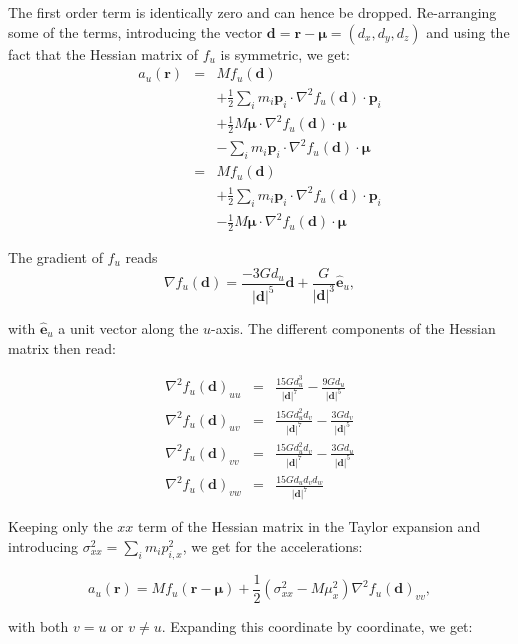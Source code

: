 \documentclass[a4paper,10pt]{article}
\newcommand{\rr}{\mathbf{r}}
\newcommand{\dd}{\mathbf{d}}
\newcommand{\p}[1]{\mathbf{p}_#1}
\newcommand{\muu}{\boldsymbol{\mu}}
\begin{document}
The first order term is identically zero and can hence be dropped. Re-arranging some of the terms, introducing the 
vector $\dd=\rr-\muu=(d_x,d_y,d_z)$ and using the fact that the Hessian matrix of $f_u$ is symmetric, we get:
\begin{eqnarray}
 a_u(\rr) &=& Mf_u(\dd) \\
           & & + \frac{1}{2} \sum_i m_i \p{i}\cdot \nabla^2f_u(\dd)\cdot \p{i}  \\
           & & + \frac{1}{2} M \muu\cdot \nabla^2f_u(\dd)\cdot \muu \\
           & & - \sum_i m_i \p{i}\cdot \nabla^2f_u(\dd)\cdot \muu \\
           &=& Mf_u(\dd) \\
           & & + \frac{1}{2} \sum_i m_i \p{i}\cdot \nabla^2f_u(\dd)\cdot \p{i} \\
           & &- \frac{1}{2} M \muu\cdot \nabla^2f_u(\dd)\cdot \muu
\end{eqnarray}

The gradient of $f_u$ reads
\begin{equation}
 \nabla f_u(\dd) = \frac{-3Gd_u}{|\dd|^5}\dd + \frac{G}{|\dd|^3}\hat{\mathbf{e}}_u,
\end{equation}

with $\hat{\mathbf{e}}_u$ a unit vector along the $u$-axis. The different components of the Hessian matrix then read:

\begin{eqnarray}
 \nabla^2f_u(\dd)_{uu} &=& \frac{15Gd_u^3}{|\dd|^7} - \frac{9Gd_u}{|\dd|^5} \\
 \nabla^2f_u(\dd)_{uv} &=& \frac{15Gd_u^2d_v}{|\dd|^7} - \frac{3Gd_v}{|\dd|^5}\\
 \nabla^2f_u(\dd)_{vv} &=& \frac{15Gd_u^2d_v}{|\dd|^7} - \frac{3Gd_u}{|\dd|^5} \\
 \nabla^2f_u(\dd)_{vw} &=& \frac{15Gd_ud_vd_w}{|\dd|^7} 
\end{eqnarray}

Keeping only the $xx$ term of the Hessian matrix in the Taylor expansion and introducing $\sigma_{xx}^2 = 
\sum_im_ip_{i,x}^2$, we get for the accelerations:

\begin{equation}
 a_u(\rr) = Mf_u(\rr-\muu) + \frac{1}{2}(\sigma_{xx}^2 - M\mu_x^2)\nabla^2f_u(\dd)_{vv},
\end{equation}

with both $v=u$ or $v\neq u$. Expanding this coordinate by coordinate, we get:
\end{document}
